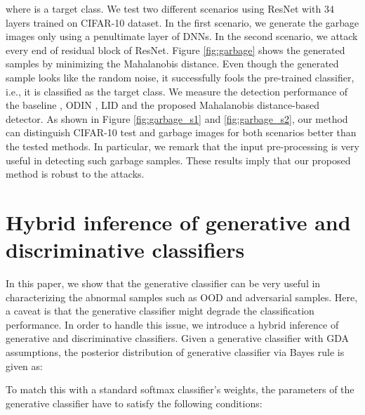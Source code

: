 \documentclass{article}
\begin{document}
where  is a target class.
We test two different scenarios using ResNet with 34 layers trained on CIFAR-10 dataset.
In the first scenario, 
we generate the garbage images only using a penultimate layer of DNNs. In the second scenario, we attack every end of residual block of ResNet.
Figure \ref{fig:garbage} shows the generated samples by minimizing the Mahalanobis distance.
Even though the generated sample looks like the random noise,
it successfully fools the pre-trained classifier, i.e., it is classified as the target class.
We measure the detection performance of the baseline \citep{hendrycks2016baseline}, ODIN \citep{liang2017principled}, LID \citep{ma2018characterizing} and the proposed Mahalanobis distance-based detector.
As shown in Figure \ref{fig:garbage_s1} and \ref{fig:garbage_s2},
our method can distinguish CIFAR-10 test and garbage images for both scenarios better than the tested methods.
In particular, we remark that the input pre-processing is very useful in detecting such garbage samples.
These results imply that our proposed method is robust to the attacks.

\iffalse
\subsection{Adaptive attack: optimization-based adversarial attack}

Formally, we generate an adversarial examples as follows:

where  is the label corresponding to the second largest output of the classifier,  is penalty parameter and  is a metric to quantify the distance between an original image and its adversarial counterpart.
\fi

\section{Hybrid inference of generative and discriminative classifiers}

In this paper, we show that the generative classifier can be very useful in characterizing the abnormal samples such as OOD and adversarial samples.
Here, a caveat is that the generative classifier might degrade the classification performance.
In order to handle this issue, 
we introduce a hybrid inference of generative and discriminative classifiers.
Given a generative classifier with GDA assumptions, 
the posterior distribution of generative classifier via Bayes rule is given as:

To match this with a standard softmax classifier's weights,
the parameters of the generative classifier have to satisfy the following conditions:
\end{document}
